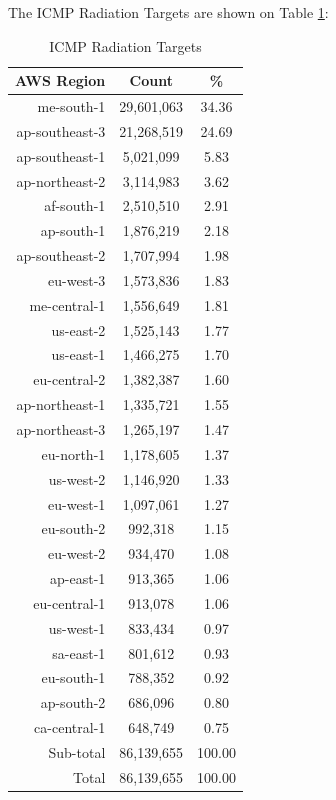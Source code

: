 \newpage
The ICMP Radiation Targets are shown on Table \ref{tab:icmpradiationtargets}:
\begin{table}[!h]
\begin{center}
\caption{ICMP Radiation Targets}
\label{tab:icmpradiationtargets}
\begin{tabular}{ |r|c|c| }
\hline
\centering AWS Region & Count & \%  \\
\hline
me-south-1 & 29,601,063 & 34.36  \\
ap-southeast-3 & 21,268,519 & 24.69  \\
ap-southeast-1 & 5,021,099 & 5.83  \\
ap-northeast-2 & 3,114,983 & 3.62  \\
af-south-1 & 2,510,510 & 2.91  \\
ap-south-1 & 1,876,219 & 2.18  \\
ap-southeast-2 & 1,707,994 & 1.98  \\
eu-west-3 & 1,573,836 & 1.83  \\
me-central-1 & 1,556,649 & 1.81  \\
us-east-2 & 1,525,143 & 1.77  \\
us-east-1 & 1,466,275 & 1.70  \\
eu-central-2 & 1,382,387 & 1.60  \\
ap-northeast-1 & 1,335,721 & 1.55  \\
ap-northeast-3 & 1,265,197 & 1.47  \\
eu-north-1 & 1,178,605 & 1.37  \\
us-west-2 & 1,146,920 & 1.33  \\
eu-west-1 & 1,097,061 & 1.27  \\
eu-south-2 & 992,318 & 1.15  \\
eu-west-2 & 934,470 & 1.08  \\
ap-east-1 & 913,365 & 1.06  \\
eu-central-1 & 913,078 & 1.06  \\
us-west-1 & 833,434 & 0.97  \\
sa-east-1 & 801,612 & 0.93  \\
eu-south-1 & 788,352 & 0.92  \\
ap-south-2 & 686,096 & 0.80  \\
ca-central-1 & 648,749 & 0.75  \\
\hline
Sub-total & 86,139,655 & 100.00  \\
\hline
Total & 86,139,655 & 100.00  \\
\hline
\end{tabular}
\end{center}
\end{table}

